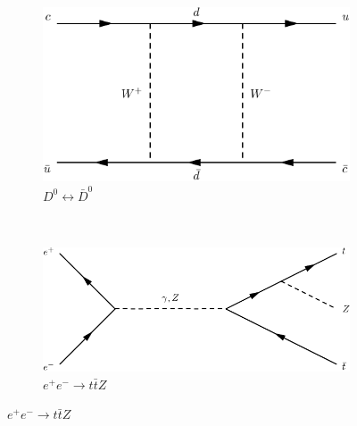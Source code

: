 \begin{figure}[h]
  \centering
  \begin{subfigure}[b]{0.3\textwidth}
    \includegraphics[width=\textwidth]{../dia/19.pdf}
    \caption{$D^0\longleftrightarrow \bar{D}^0$}
    \label{fey:19}
  \end{subfigure}
  ~
  \begin{subfigure}[b]{0.3\textwidth}
    \includegraphics[width=\textwidth]{../dia/20.pdf}
    \caption{$e^+e^- \rightarrow t\bar{t}Z$}
    \label{fey:20}
  \end{subfigure}
\end{figure}
